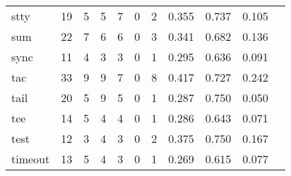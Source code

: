 \begin{longtable}{lp{1.10cm}p{1.10cm}p{1.10cm}p{1.10cm}p{1.10cm}p{1.10cm}p{1.10cm}p{1.10cm}p{1.10cm}p{1.10cm}}
stty      &                     19 &                                  5 &                                 5 &                                7 &                                 0 &                               2 &                          0.355 &                                 0.737 &                               0.105 \\
sum       &                     22 &                                  7 &                                 6 &                                6 &                                 0 &                               3 &                          0.341 &                                 0.682 &                               0.136 \\
sync      &                     11 &                                  4 &                                 3 &                                3 &                                 0 &                               1 &                          0.295 &                                 0.636 &                               0.091 \\
tac       &                     33 &                                  9 &                                 9 &                                7 &                                 0 &                               8 &                          0.417 &                                 0.727 &                               0.242 \\
tail      &                     20 &                                  5 &                                 9 &                                5 &                                 0 &                               1 &                          0.287 &                                 0.750 &                               0.050 \\
tee       &                     14 &                                  5 &                                 4 &                                4 &                                 0 &                               1 &                          0.286 &                                 0.643 &                               0.071 \\
test      &                     12 &                                  3 &                                 4 &                                3 &                                 0 &                               2 &                          0.375 &                                 0.750 &                               0.167 \\
timeout   &                     13 &                                  5 &                                 4 &                                3 &                                 0 &                               1 &                          0.269 &                                 0.615 &                               0.077 \\

\end{longtable}
